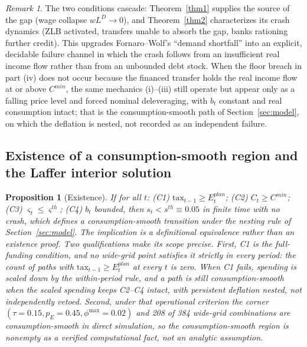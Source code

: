 \documentclass[review,12pt]{elsarticle}
\theoremstyle{plain}
\newtheorem{proposition}[theorem]{Proposition}
\theoremstyle{definition}
\theoremstyle{remark}
\newtheorem{remark}[theorem]{Remark}
\begin{document}
\begin{remark}
The two conditions cascade: Theorem~\ref{thm1} supplies the source of the gap (wage collapse $wL^D\to0$), and Theorem~\ref{thm2} characterizes its crash dynamics (ZLB activated, transfers unable to absorb the gap, banks rationing further credit). This upgrades Fornaro--Wolf's ``demand shortfall'' into an explicit, decidable failure channel in which the crash follows from an insufficient real income flow rather than from an unbounded debt stock. When the floor breach in part (iv) does not occur because the financed transfer holds the real income flow at or above $C^{min}$, the same mechanics (i)--(iii) still operate but appear only as a falling price level and forced nominal deleveraging, with $b_t$ constant and real consumption intact; that is the consumption-smooth path of Section~\ref{sec:model}, on which the deflation is nested, not recorded as an independent failure.
\end{remark}

\subsection{Existence of a consumption-smooth region and the Laffer interior solution}
\begin{proposition}[Existence]
\label{prop3a}
If for all $t$: (C1) $\text{tax}_{t-1}\ge E_t^{plan}$; (C2) $C_t\ge C^{min}$; (C3) $\varsigma_t\le\varsigma^{th}$; (C4) $b_t$ bounded, then $s_t<s^{th}\equiv0.05$ in finite time with no crash, which defines a consumption-smooth transition under the nesting rule of Section~\ref{sec:model}. The implication is a definitional equivalence rather than an existence proof. Two qualifications make its scope precise. First, C1 is the full-funding condition, and no wide-grid point satisfies it strictly in every period: the count of paths with $\text{tax}_{t-1}\ge E_t^{plan}$ at every $t$ is zero. When C1 fails, spending is scaled down by the within-period rule, and a path is still consumption-smooth when the scaled spending keeps C2--C4 intact, with persistent deflation nested, not independently vetoed. Second, under that operational criterion the corner $(\tau=0.15,p_E=0.45,\phi^{\max}=0.02)$ and 208 of 384 wide-grid combinations are consumption-smooth in direct simulation, so the consumption-smooth region is nonempty as a verified computational fact, not an analytic assumption.
\end{proposition}
\end{document}
